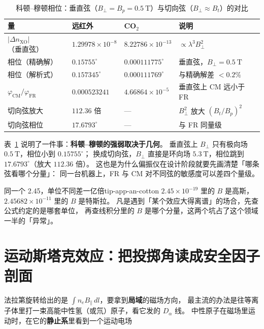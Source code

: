 \begin{table}[htbp]
\centering
\caption{科顿--穆顿相位：垂直弦（$B_\perp=B_p=0.5\ \mathrm{T}$）与切向弦（$B_\perp\approx B_t$）的对比}
\label{tab:app-an-cotton}
\small
\begin{tabular}{p{3.2cm} p{2.8cm} p{3.0cm} p{4.4cm}}
\toprule
量 & 远红外 & CO$_2$ & 说明 \\
\midrule
$|\Delta n_{\mathrm{XO}}|$（垂直弦） & $1.29978\times10^{-8}$ & $8.22786\times10^{-13}$ & $\propto\lambda^3B_\perp^2$ \\
相位（精确解） & $0.15755^\circ$ & $0.000111775^\circ$ & 垂直弦，$B_\perp=0.5\ \mathrm{T}$ \\
相位（解析式） & $0.157345^\circ$ & $0.000111769^\circ$ & 与精确解差 $<0.2\%$ \\
$\varphi_{\mathrm{CM}}/\varphi_{\mathrm{FR}}$ & $0.000523241$ & $4.66864\times10^{-5}$ & 垂直弦上 CM 远小于 FR \\
切向弦放大 & $112.36$ 倍 & --- & $B_\perp^2$ 放大 $(B_t/B_p)^2$ \\
切向弦相位 & $17.6793^\circ$ & --- & 与 FR 同量级 \\
\bottomrule
\end{tabular}
\end{table}

表~\ref{tab:app-an-cotton} 说明了一件事：\textbf{科顿--穆顿的强弱取决于几何}。
垂直弦上 $B_\perp$ 只有极向场 $0.5\ \mathrm{T}$，相位小到 $0.15755^\circ$；
换成切向弦，$B_\perp$ 直接是环向场 $5.3\ \mathrm{T}$，相位跳到 $17.6793^\circ$（放大 $112.36$ 倍）。
这也是为什么偏振仪在设计阶段就要先画清楚「哪条弦看哪个分量」：
同一台机器上，FR 与 CM 对不同弦的敏感度可以差四个量级。

\begin{tip}{同一个 2.45，单位不同差一亿倍}{tip-app-an-cotton}
$2.45\times10^{-19}$ 里的 $B$ 是高斯，$2.45682\times10^{-11}$ 里的 $B$ 是特斯拉。
凡是遇到「某个效应大得离谱」的场合，先查公式约定的是哪套单位，
再查线积分里的 $B$ 是哪个分量，这两个坑占了这个领域一半的「异常」。
\end{tip}


\section{运动斯塔克效应：把投掷角读成安全因子剖面}
\label{sec:app-an-mse}

法拉第旋转给出的是 $\int n_eB_\parallel\,dl$，要拿到\textbf{局域}的磁场方向，
最主流的办法是往等离子体里打一束高能中性氢（或氘）原子，看它发的 $D_\alpha$ 线。
中性原子在磁场里运动时，在它的\textbf{静止系}里看到一个运动电场

